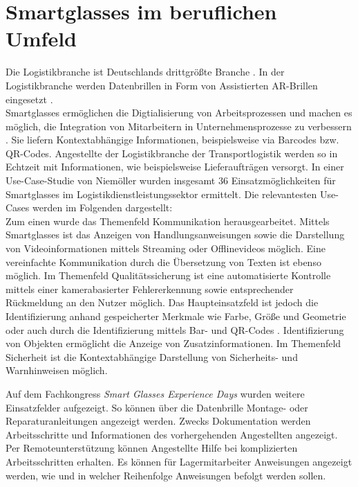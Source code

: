 \section{Smartglasses im beruflichen Umfeld}
\label{sec:Smartglasses_im beruflichen_Umfeld}
Die Logistikbranche ist Deutschlands drittgrößte Branche \cite{Zobel2016}. In der Logistikbranche werden Datenbrillen in Form von Assistierten AR-Brillen eingesetzt \cite{Niemoller2017}.
\\
Smartglasses ermöglichen die Digtialisierung von Arbeitsprozessen und machen es möglich, die Integration von Mitarbeitern in Unternehmensprozesse zu verbessern \cite{Zobel2016}. Sie liefern Kontextabhängige Informationen, beispielsweise via Barcodes bzw. QR-Codes. Angestellte der Logistikbranche der Transportlogistik werden so in Echtzeit mit Informationen, wie beispielsweise Lieferaufträgen versorgt. In einer Use-Case-Studie von Niemöller \cite{Niemoller2017} wurden insgesamt 36 Einsatzmöglichkeiten für Smartglasses im Logistikdienstleistungssektor ermittelt. Die relevantesten Use-Cases werden im Folgenden dargestellt:
\\
Zum einen wurde das Themenfeld Kommunikation herausgearbeitet. Mittels Smartglasses ist das Anzeigen von Handlungsanweisungen sowie die Darstellung von Videoinformationen mittels Streaming oder Offlinevideos möglich. Eine vereinfachte Kommunikation durch die Übersetzung von Texten ist ebenso möglich. Im Themenfeld Qualitätssicherung ist eine automatisierte Kontrolle mittels einer kamerabasierter Fehlererkennung sowie entsprechender Rückmeldung an den Nutzer möglich. Das Haupteinsatzfeld ist jedoch die Identifizierung anhand gespeicherter Merkmale wie Farbe, Größe und Geometrie oder auch durch die Identifizierung mittels Bar- und QR-Codes \cite{Niemoller2017}. Identifizierung von Objekten ermöglicht die Anzeige von Zusatzinformationen. Im Themenfeld Sicherheit ist die Kontextabhängige Darstellung von Sicherheits- und Warnhinweisen möglich. 

Auf dem Fachkongress \emph{Smart Glasses Experience Days} \cite{Manokaran-Pathamathan2017} wurden weitere Einsatzfelder aufgezeigt. So können über die Datenbrille Montage- oder Reparaturanleitungen angezeigt werden. Zwecks Dokumentation werden Arbeitsschritte und Informationen des vorhergehenden Angestellten angezeigt. Per Remoteunterstützung können Angestellte Hilfe bei komplizierten Arbeitsschritten erhalten. Es können für Lagermitarbeiter Anweisungen angezeigt werden, wie und in welcher Reihenfolge Anweisungen befolgt werden sollen.


